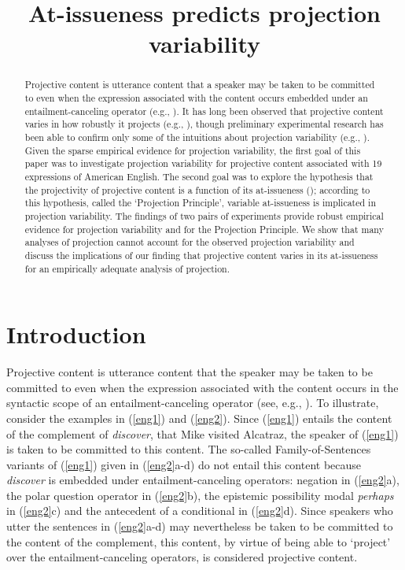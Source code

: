 \documentclass[11pt,fleqn]{article}
\title{At-issueness predicts projection variability\vspace*{-1cm}}
\author{}
\newcommand{\6}{\mbox{$[\hspace*{-.6mm}[$}}
\newcommand{\9}{\mbox{$]\hspace*{-.6mm}]$}}
\begin{document}
\maketitle

\begin{abstract}
Projective content is utterance content that a speaker may be taken to be committed to even when the expression associated with the content occurs embedded under an entailment-canceling operator (e.g., \citealt{ccmg90}). It has long been observed that projective content varies in how robustly it projects (e.g., \citealt{karttunen71b,simons01,abusch10}), though preliminary experimental research has been able to confirm only some of the intuitions about projection variability (e.g., \citealt{xue-onea11,smith-hall11}). Given the sparse empirical evidence for projection variability, the first goal of this paper was to investigate projection variability for projective content associated with 19 expressions of American English. The second goal was to explore the hypothesis that the projectivity of projective content is a function of its at-issueness (\citealt{brst-salt10,brst-ar}); according to this hypothesis, called the `Projection Principle', variable at-issueness is implicated in projection variability. The findings of two pairs of experiments provide robust empirical evidence for projection variability and for the Projection Principle. We show that many analyses of projection  cannot account for the observed projection variability and discuss the implications of our finding that projective content varies in its at-issueness for an empirically adequate analysis of projection.

\end{abstract}


			
\section{Introduction}\label{s1}

Projective content is utterance content that the speaker may be taken to be committed to even when the expression associated with the content occurs in the syntactic scope of an entailment-canceling operator (see, e.g., \citealt{ccmg90}). To illustrate, consider the examples in (\ref{eng1}) and (\ref{eng2}). Since (\ref{eng1}) entails the content of the complement of {\em discover}, that Mike visited Alcatraz, the speaker of (\ref{eng1}) is taken to be committed to this content. The so-called Family-of-Sentences variants of (\ref{eng1}) given in (\ref{eng2}a-d) do not entail this content because {\em discover} is embedded under entailment-canceling operators: negation in (\ref{eng2}a), the polar question operator in (\ref{eng2}b), the epistemic possibility modal {\em perhaps} in (\ref{eng2}c) and the antecedent of a conditional in (\ref{eng2}d). Since speakers who utter the sentences in (\ref{eng2}a-d) may nevertheless be taken to be committed to the content of the complement, this content, by virtue of being able to `project' over the entailment-canceling operators, is considered projective content. 
\end{document}
